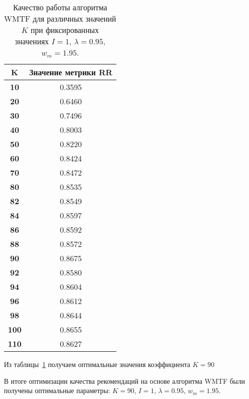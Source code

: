     \begin{table}[ht!]
        \caption{Качество работы алгоритма WMTF для различных значений $K$ при фиксированных значениях $I=1$, $\lambda=0.95$, $w_m=1.95$. \bigskip}
        \centering

        \label{tabular:wtmf_test4}
        \begin{tabular}{|c|c|} \hline
            \bf{K}  & \bf{Значение метрики RR} \\ \hline
            \bf{10} & 0.3595 \\ \hline
            \bf{20} & 0.6460 \\ \hline
            \bf{30} & 0.7496 \\ \hline
            \bf{40} & 0.8003 \\ \hline
            \bf{50} & 0.8220 \\ \hline
            \bf{60} & 0.8424 \\ \hline
            \bf{70} & 0.8472 \\ \hline
            \bf{80} & 0.8535 \\ \hline
            \bf{82} & 0.8549 \\ \hline
            \bf{84} & 0.8597 \\ \hline
            \bf{86} & 0.8592 \\ \hline
            \bf{88} & 0.8572 \\ \hline
            \bf{90} & 0.8675 \\ \hline
            \bf{92} & 0.8580 \\ \hline
            \bf{94} & 0.8604 \\ \hline
            \bf{96} & 0.8612 \\ \hline
            \bf{98} & 0.8644 \\ \hline
            \bf{100} & 0.8655 \\ \hline
            \bf{110} & 0.8627 \\ \hline
        \end{tabular}
    \end{table}
    Из таблицы~\ref{tabular:wtmf_test4} получаем оптимальные значения коэффициента $K=90$

    В итоге оптимизации качества рекомендаций на основе алгоритма WMTF были получены оптимальные параметры:
    $K=90$, $I=1$, $\lambda=0.95$, $w_m=1.95$.

    \clearpage